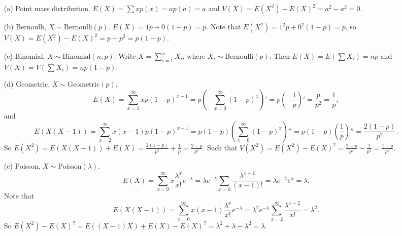 \begin{itemize}
\item[(a)] Point mass distribution. $E(X) = \sum x p(x) = a p(a) = a$ and $V(X) = E(X^2) - E(X)^2 = a^2 - a^2 = 0$.

\item[(b)] Bernoulli, $X \sim \mathrm{Bernoulli}(p)$. $E(X) = 1p + 0(1-p) = p$.
Note that $E(X^2) = 1^2p + 0^2(1-p) = p$, so $V(X) = E(X^2) - E(X)^2 = p - p^2 = p(1 - p)$.

\item[(c)] Binomial, $X \sim \mathrm{Binomial}(n, p)$.
Write $X = \sum_{i = 1}^n X_i$, where $X_i \sim \mathrm{Bernoulli}(p)$.
Then $E(X) = E(\sum X_i) = np$ and $V(X) = V(\sum X_i) = np(1 - p)$.

\item[(d)] Geometric, $X \sim \mathrm{Geometric}(p)$.
\begin{equation*}
E(X) = \sum_{x = 1}^{\infty} xp(1 - p)^{x - 1}
    = p \left(-\sum_{x = 0}^{\infty} (1 - p)^{x}\right)'
    = p \left(-\frac{1}{p}\right)'
    = \frac{p}{p^2}
    = \frac{1}{p},
\end{equation*}
and
\begin{equation*}
E(X(X - 1)) = \sum_{x = 2}^{\infty} x(x - 1) p (1 - p)^{x - 1}
    = p (1 - p) \left(\sum_{x = 0}^{\infty} (1 - p)^{x}\right)''
    = p (1 - p) \left(\frac{1}{p}\right)''
    = \frac{2(1 - p)}{p^2}.
\end{equation*}
So $E(X^2) = E(X(X - 1)) + E(X) = \frac{2(1 - p)}{p^2} + \frac{1}{p} = \frac{2 - p}{p^2}$.
Such that $V(X^2) = E(X^2) - E(X)^2 = \frac{2 - p}{p^2} - \frac{1}{p^2} = \frac{1 - p}{p^2}$.

\item[(e)] Poisson, $X \sim \mathrm{Poisson}(\lambda)$.
\begin{equation*}
E(X) = \sum_{x = 0}^{\infty} x \frac{\lambda^x}{x!} e^{-\lambda}
    = \lambda e^{-\lambda} \sum_{x = 0} \frac{\lambda^{x-1}}{(x-1)!}
    = \lambda e^{-\lambda} e^{\lambda}
    = \lambda.
\end{equation*}
Note that
\begin{equation*}
E(X(X-1)) = \sum_{x = 0}^{\infty} x(x - 1) \frac{\lambda^x}{x!} e^{-\lambda}
    = \lambda^2 e^{-\lambda} \sum_{x = 2}^{\infty} \frac{\lambda^{x-2}}{x!}
    = \lambda^2.
\end{equation*}
So $E(X^2) - E(X)^2 = E((X - 1)X) + E(X) - E(X)^2 = \lambda^2 + \lambda - \lambda^2 = \lambda$.


\end{itemize}
